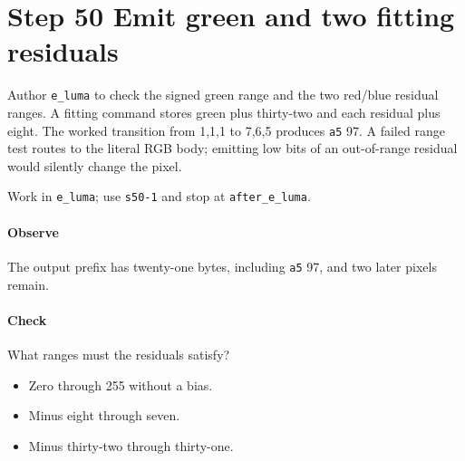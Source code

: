 \section{Step 50 Emit green and two fitting residuals}\label{qoi-s50}
Author \texttt{e\_luma} to check the signed green range and the two red/blue residual ranges. A fitting command stores green plus thirty-two and each residual plus eight. The worked transition from 1,1,1 to 7,6,5 produces \texttt{a5} 97. A failed range test routes to the literal RGB body; emitting low bits of an out-of-range residual would silently change the pixel.

Work in \texttt{e\_luma}; use \texttt{s50-1} and stop at \texttt{after\_e\_luma}.

\paragraph{Observe} The output prefix has twenty-one bytes, including \texttt{a5} 97, and two later pixels remain.

\paragraph{Check} What ranges must the residuals satisfy?
\begin{itemize}
\item[A.] Zero through 255 without a bias.
\item[B.] Minus eight through seven.
\item[C.] Minus thirty-two through thirty-one.
\end{itemize}
